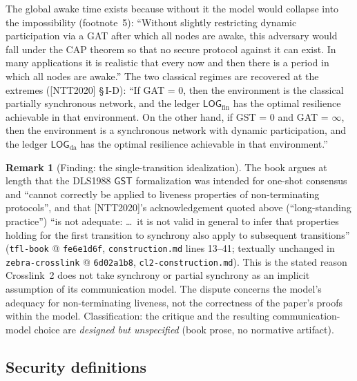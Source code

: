 \documentclass[11pt,a4paper]{article}
\theoremstyle{definition}
\newtheorem{remark}[theorem]{Remark}
\begin{document}
The global awake time exists because without it the model would collapse
into the impossibility (footnote~5): ``Without slightly restricting
dynamic participation via a GAT after which all nodes are awake, this
adversary would fall under the CAP theorem so that no secure protocol
against it can exist. In many applications it is realistic that every now
and then there is a period in which all nodes are awake.'' The two
classical regimes are recovered at the extremes ([NTT2020] \S\,I-D): ``If
GAT = 0, then the environment is the classical partially synchronous
network, and the ledger $\mathsf{LOG}_{\mathrm{fin}}$ has the optimal
resilience achievable in that environment. On the other hand, if GST = 0
and GAT = $\infty$, then the environment is a synchronous network with
dynamic participation, and the ledger $\mathsf{LOG}_{\mathrm{da}}$ has the
optimal resilience achievable in that environment.''

\begin{remark}[Finding: the single-transition idealization]
\label{rem:xl-gst-critique}
The book argues at length that the DLS1988 $\mathsf{GST}$ formalization
was intended for one-shot consensus and ``cannot correctly be applied to
liveness properties of non-terminating protocols'', and that [NTT2020]'s
acknowledgement quoted above (``long-standing practice'') ``is not
adequate: \dots\ it is not valid in general to infer that properties
holding for the first transition to synchrony also apply to subsequent
transitions'' (\texttt{tfl-book} @ \texttt{fe6e1d6f},
\texttt{construction.md} lines 13--41; textually unchanged in
\texttt{zebra-crosslink} @ \texttt{6d02a1b8},
\texttt{cl2-construction.md}). This is the stated reason Crosslink~2 does
not take synchrony or partial synchrony as an implicit assumption of its
communication model. The dispute concerns the model's adequacy for
non-terminating liveness, not the correctness of the paper's proofs
within the model. Classification: the critique and the resulting
communication-model choice are \emph{designed but unspecified} (book
prose, no normative artifact).
\end{remark}

\subsection{Security definitions}\label{sec:xl-security-defs}
\end{document}
